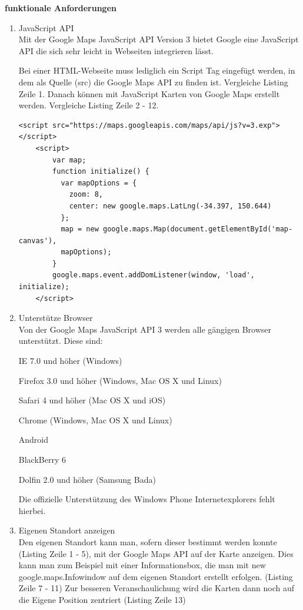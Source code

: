 \textbf{funktionale Anforderungen}
\begin{enumerate}
\item JavaScript API\\
Mit der Google Maps JavaScript API Version 3 bietet Google eine JavaScript API die sich sehr leicht in Webseiten integrieren lässt. 

Bei einer HTML-Webseite muss lediglich ein Script Tag eingefügt werden, in dem als Quelle (src) die Google Maps API zu finden ist. Vergleiche Listing Zeile 1. Danach können mit JavaScript Karten von Google Maps erstellt werden. Vergleiche Listing Zeile 2 - 12.
\begin{lstlisting}
<script src="https://maps.googleapis.com/maps/api/js?v=3.exp"></script>
    <script>
		var map;
		function initialize() {
		  var mapOptions = {
		    zoom: 8,
		    center: new google.maps.LatLng(-34.397, 150.644)
		  };
		  map = new google.maps.Map(document.getElementById('map-canvas'),
	      mapOptions);
		}
		google.maps.event.addDomListener(window, 'load', initialize);
    </script>
\end{lstlisting} \cite[Codebeispiel Simple Map]{googlemaps}


\item Unterstütze Browser\\
Von der Google Maps JavaScript API 3 werden alle gängigen Browser unterstützt. Diese sind:

\glqq 
    IE 7.0 und höher (Windows)
    
    Firefox 3.0 und höher (Windows, Mac OS X und Linux)
    
    Safari 4 und höher (Mac OS X und iOS)
    
    Chrome (Windows, Mac OS X und Linux)
    
    Android
    
    BlackBerry 6
    
    Dolfin 2.0 und höher (Samsung Bada)
\grqq \cite{googlemaps}

Die offizielle Unterstützung des Windows Phone Internetexplorers fehlt hierbei.

\item Eigenen Standort anzeigen\\
Den eigenen Standort kann man, sofern dieser bestimmt werden konnte (Listing Zeile 1 - 5), mit der Google Maps API auf der Karte anzeigen. Dies kann man zum Beispiel mit einer Informationsbox, die man mit \glqq new google.maps.Infowindow \grqq auf dem eigenen Standort erstellt erfolgen. (Listing Zeile 7 - 11) Zur besseren Veranschaulichung wird die Karten dann noch auf die Eigene Position zentriert (Listing Zeile 13)


\end{enumerate}
